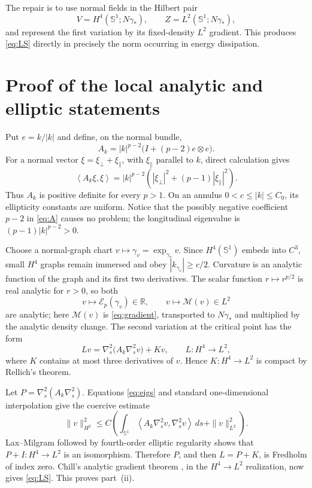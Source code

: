 \documentclass[11pt]{article}
\newcommand{\E}{\mathcal E_p}
\newcommand{\R}{\mathbb R}
\newcommand{\Sone}{\mathbb S^1}
\newcommand{\ip}[2]{\left\langle #1,#2\right\rangle}
\begin{document}
The repair is to use normal fields in the Hilbert pair
\[
 V=H^4(\Sone;N\gamma_*),\qquad Z=L^2(\Sone;N\gamma_*),
\]
and represent the first variation by its fixed-density $L^2$ gradient.  This
produces \eqref{eq:LS} directly in precisely the norm occurring in energy
dissipation.

\section*{Proof of the local analytic and elliptic statements}

Put $e=k/|k|$ and define, on the normal bundle,
\begin{equation}\label{eq:A}
 A_k=|k|^{p-2}\bigl(I+(p-2)e\otimes e\bigr).
\end{equation}
For a normal vector $\xi=\xi_\perp+\xi_\parallel$, with $\xi_\parallel$
parallel to $k$, direct calculation gives
\begin{equation}\label{eq:eigs}
 \ip{A_k\xi}{\xi}
 =|k|^{p-2}\left(|\xi_\perp|^2+(p-1)|\xi_\parallel|^2\right).
\end{equation}
Thus $A_k$ is positive definite for every $p>1$.  On an annulus
$0<c\le |k|\le C_0$, its ellipticity constants are uniform.  Notice that
the possibly negative coefficient $p-2$ in \eqref{eq:A} causes no problem;
the longitudinal eigenvalue is $(p-1)|k|^{p-2}>0$.

Choose a normal-graph chart $v\mapsto\gamma_v=\exp_{\gamma_*}v$.  Since
$H^4(\Sone)$ embeds into $C^3$, small $H^4$ graphs remain immersed and obey
$|k_{\gamma_v}|\ge c/2$.  Curvature is an analytic function of the graph and
its first two derivatives.  The scalar function $r\mapsto r^{p/2}$ is real
analytic for $r>0$, so both
\[
 v\longmapsto \E(\gamma_v)\in\R,
 \qquad
 v\longmapsto \mathcal M(v)\in L^2
\]
are analytic; here $\mathcal M(v)$ is \eqref{eq:gradient}, transported to
$N\gamma_*$ and multiplied by the analytic density change.  The second
variation at the critical point has the form
\begin{equation}\label{eq:hessian}
 L v=\nabla_s^2\bigl(A_k\nabla_s^2v\bigr)+Kv,
 \qquad L:H^4\longrightarrow L^2,
\end{equation}
where $K$ contains at most three derivatives of $v$.  Hence $K:H^4\to L^2$
is compact by Rellich's theorem.

Let $P=\nabla_s^2(A_k\nabla_s^2)$.  Equations \eqref{eq:eigs} and standard
one-dimensional interpolation give the coercive estimate
\[
 \|v\|_{H^2}^2
 \le C\left(\int_{\Sone}\ip{A_k\nabla_s^2v}{\nabla_s^2v}\,ds
 +\|v\|_{L^2}^2\right).
\]
Lax--Milgram followed by fourth-order elliptic regularity shows that
$P+I:H^4\to L^2$ is an isomorphism.  Therefore $P$, and then $L=P+K$, is
Fredholm of index zero.  Chill's analytic gradient theorem
\cite[Corollary 3.11]{Chill}, in the $H^4\to L^2$ realization, now gives
\eqref{eq:LS}.  This proves part~\textup{(ii)}.
\end{document}
